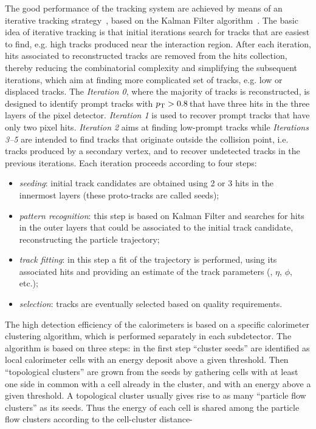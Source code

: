 The good performance of the tracking system are achieved by means of an iterative tracking strategy~\cite{Chatrchyan:2014fea}, based on the Kalman Filter algorithm~\cite{Billoir:1990we}. The basic idea of iterative tracking is that initial iterations search for tracks that are easiest to find, e.g. high \pt tracks produced near the interaction region. After each iteration, hits associated to reconstructed tracks are removed from the hits collection, thereby reducing the combinatorial complexity and simplifying the subsequent iterations, which aim at finding more complicated set of tracks, e.g. low \pt or displaced tracks. The \emph{Iteration 0}, where the majority of tracks is reconstructed, is designed to identify prompt tracks with $p_\mathrm{T}>0.8$\,\GeV that have three hits in the three layers of the pixel detector. \emph{Iteration 1} is used to recover prompt tracks that have only two pixel hits. \emph{Iteration 2} aims at finding low-\pt prompt tracks while \emph{Iterations 3--5} are intended to find tracks that originate outside the collision point, i.e. tracks produced by a secondary vertex, and to recover undetected tracks in the previous iterations. Each iteration proceeds according to four steps:
\begin{itemize}
\item \emph{seeding}: initial track candidates are obtained using 2 or 3 hits in the innermost layers (these proto-tracks are called seeds);
\item \emph{pattern recognition}: this step is based on Kalman Filter and searches for hits in the outer layers that could be associated to the initial track candidate, reconstructing the particle trajectory;
\item \emph{track fitting}: in this step a fit of the trajectory is performed, using its associated hits and providing an estimate of the track parameters (\pt, $\eta$, $\phi$, etc.);
\item \emph{selection}: tracks are eventually selected based on quality requirements.
\end{itemize}

The high detection efficiency of the calorimeters is based on a specific calorimeter clustering algorithm, which is performed separately in each subdetector. The algorithm is based on three steps: in the first step ``cluster seeds'' are identified as local calorimeter cells with an energy deposit above a given threshold. Then ``topological clusters'' are grown from the seeds by gathering cells with at least one side in common with a cell already in the cluster, and with an energy above a given threshold. A topological cluster usually gives rise to as many ``particle flow clusters'' as its seeds. Thus the energy of each cell is shared among the particle flow clusters according to the cell-cluster distance-

